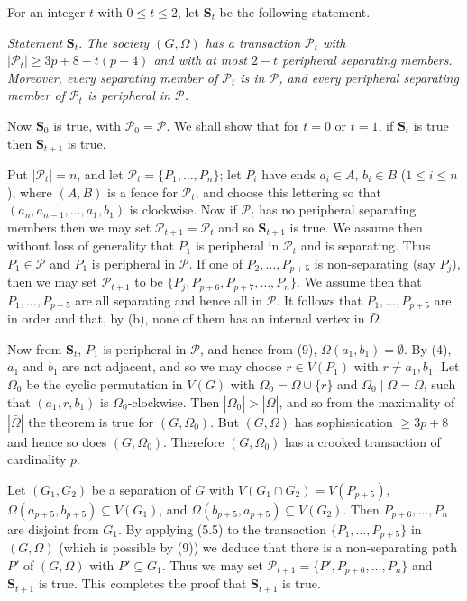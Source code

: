 For an integer $t$ with $0 \le t \le 2$, let $\mathbf{S}_t$ be the following statement.

\textit{Statement} $\mathbf{S}_t$. \textit{The society $(G, \Omega)$ has a transaction $\mathcal{P}_t$ with $|\mathcal{P}_t| \ge 3p + 8 - t(p + 4)$ and with at most $2 - t$ peripheral separating members. Moreover, every separating member of $\mathcal{P}_t$ is in $\mathcal{P}$, and every peripheral separating member of $\mathcal{P}_t$ is peripheral in $\mathcal{P}$.}

Now $\mathbf{S}_0$ is true, with $\mathcal{P}_0 = \mathcal{P}$. We shall show that for $t = 0$ or $t = 1$, if $\mathbf{S}_t$ is true then $\mathbf{S}_{t+1}$ is true.

Put $|\mathcal{P}_t| = n$, and let $\mathcal{P}_t = \{P_1, \dots, P_n\}$; let $P_i$ have ends $a_i \in A$, $b_i \in B$ ($1 \le i \le n$), where $(A, B)$ is a fence for $\mathcal{P}_t$, and choose this lettering so that $(a_n, a_{n-1}, \dots, a_1, b_1)$ is clockwise. Now if $\mathcal{P}_t$ has no peripheral separating members then we may set $\mathcal{P}_{t+1} = \mathcal{P}_t$ and so $\mathbf{S}_{t+1}$ is true. We assume then without loss of generality that $P_1$ is peripheral in $\mathcal{P}_t$ and is separating. Thus $P_1 \in \mathcal{P}$ and $P_1$ is peripheral in $\mathcal{P}$. If one of $P_2, \dots, P_{p+5}$ is non-separating (say $P_j$), then we may set $\mathcal{P}_{t+1}$ to be $\{P_j, P_{p+6}, P_{p+7}, \dots, P_n\}$. We assume then that $P_1, \dots, P_{p+5}$ are all separating and hence all in $\mathcal{P}$. It follows that $P_1, \dots, P_{p+5}$ are in order and that, by (b), none of them has an internal vertex in $\bar{\Omega}$.

Now from $\mathbf{S}_t$, $P_1$ is peripheral in $\mathcal{P}$, and hence from (9), $\Omega(a_1, b_1) = \emptyset$. By (4), $a_1$ and $b_1$ are not adjacent, and so we may choose $r \in V(P_1)$ with $r \ne a_1, b_1$. Let $\Omega_0$ be the cyclic permutation in $V(G)$ with $\bar{\Omega}_0 = \bar{\Omega} \cup \{r\}$ and $\Omega_0 \mid \bar{\Omega} = \Omega$, such that $(a_1, r, b_1)$ is $\Omega_0$-clockwise. Then $|\bar{\Omega}_0| > |\bar{\Omega}|$, and so from the maximality of $|\bar{\Omega}|$ the theorem is true for $(G, \Omega_0)$. But $(G, \Omega)$ has sophistication $\ge 3p + 8$ and hence so does $(G, \Omega_0)$. Therefore $(G, \Omega_0)$ has a crooked transaction of cardinality $p$.

Let $(G_1, G_2)$ be a separation of $G$ with $V(G_1 \cap G_2) = V(P_{p+5})$, $\Omega(a_{p+5}, b_{p+5}) \subseteq V(G_1)$, and $\Omega(b_{p+5}, a_{p+5}) \subseteq V(G_2)$. Then $P_{p+6}, \dots, P_n$ are disjoint from $G_1$. By applying (5.5) to the transaction $\{P_1, \dots, P_{p+5}\}$ in $(G, \Omega)$ (which is possible by (9)) we deduce that there is a non-separating path $P'$ of $(G, \Omega)$ with $P' \subseteq G_1$. Thus we may set $\mathcal{P}_{t+1} = \{P', P_{p+6}, \dots, P_n\}$ and $\mathbf{S}_{t+1}$ is true. This completes the proof that $\mathbf{S}_{t+1}$ is true.

